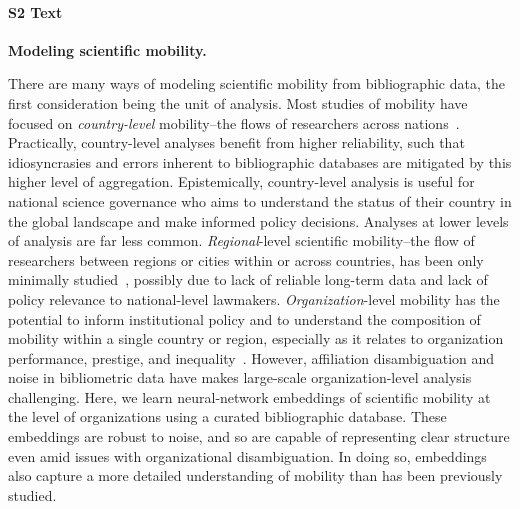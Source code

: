 \documentclass[12pt]{article} %
\begin{document}
%
\paragraph*{S2 Text}
\label{si:text:mobility_models}
{\bf Modeling scientific mobility.}

There are many ways of modeling scientific mobility from bibliographic data, the first consideration being the unit of analysis.
Most studies of mobility have focused on \textit{country-level} mobility--the flows of researchers across nations~\autocite{sugimoto2017mostimpact, scellato2015migrant, robinson-garcia2018indicators, franzoni2012foreign-born}.
Practically, country-level analyses benefit from higher reliability, such that idiosyncrasies and errors inherent to bibliographic databases are mitigated by this higher level of aggregation.
Epistemically, country-level analysis is useful for national science governance who aims to understand the status of their country in the global landscape and make informed policy decisions.
Analyses at lower levels of analysis are far less common.
\textit{Regional}-level scientific mobility--the flow of researchers between regions or cities within or across countries, has been only minimally studied~\autocite{vaccario2019mobility}, possibly due to lack of reliable long-term data and lack of policy relevance to national-level lawmakers.
\textit{Organization}-level mobility has the potential to inform institutional policy and to understand the composition of mobility within a single country or region, especially as it relates to organization performance, prestige, and inequality~\autocite{albarran2017topeconomic, deville2014career, morgan2018prestige, clauset2015hierarchy}.
However, affiliation disambiguation and noise in bibliometric data have makes large-scale organization-level analysis challenging.
Here, we learn neural-network embeddings of scientific mobility at the level of organizations using a curated bibliographic database.
These embeddings are robust to noise, and so are capable of representing clear structure even amid issues with organizational disambiguation.
In doing so, embeddings also capture a more detailed understanding of mobility than has been previously studied.
\end{document}
